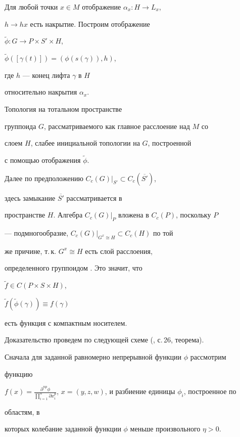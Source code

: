 \begin{pf}


Для любой точки $x \in M$ отображение $\alpha_x: H \to L_x$,


$h \to hx$ есть накрытие. Построим отображение


$\widetilde\phi: G \to P \times S' \times H$,


$\widetilde\phi([\gamma(t)]) = (\phi(s(\gamma)), h)$,


где $h$ --- конец лифта $\gamma$ в $H$


относительно накрытия $\alpha_x$.


Топология на тотальном пространстве


группоида $G$, рассматриваемого как главное расслоение над $M$ со


слоем $H$, слабее инициальной топологии на $G$, построенной


с помощью отображения $\widetilde \phi$.





Далее по предположению $C_c(G)|_{S'} \subset C_c(\overline{S'})$,


здесь замыкание $\overline{S'}$ рассматривается в


пространстве $H$. Алгебра $C_c(G)|_P$ вложена в $C_c(P)$, поскольку $P$


--- подмногообразие, $C_c(G)|_{G^x \cong H} \subset C_c(H)$ по той


же причине, т.\,к. $G^x \cong H$ есть слой расслоения,


определенного группоидом \cite{MA}. Это значит, что


$\widetilde f \in C(P \times S \times H)$,


$\widetilde f(\widetilde \phi(\gamma))\equiv f(\gamma)$


есть функция с компактным носителем.





Доказательство проведем по следующей схеме (\cite{R}, с.\,26, теорема).


Сначала для заданной равномерно непрерывной функции $\phi$ рассмотрим


функцию


$f(x)=\frac{\partial^{n p}\phi}{\prod\limits_{i=1}^{n}\partial


x_i^p}$, $x=(y, z, w)$, и разбиение единицы $\phi_i$, построенное по


областям, в


которых колебание заданной функции $\phi$ меньше произвольного $\eta>0$.



\end{pf}
